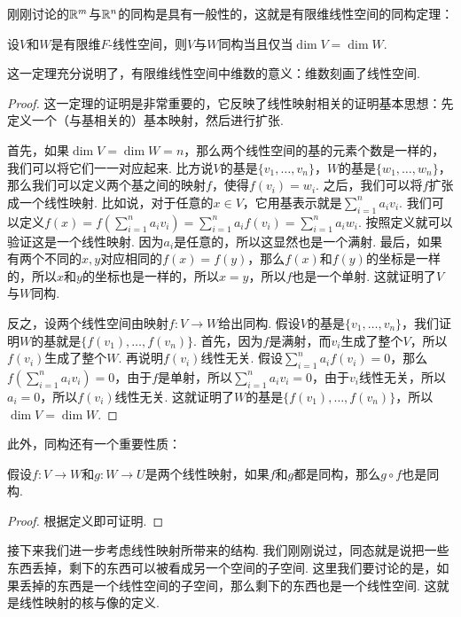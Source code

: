 刚刚讨论的$\mathbb{R}^m$与$\mathbb{R}^n$的同构是具有一般性的，这就是有限维线性空间的同构定理：

\begin{theorem}[有限维线性空间的同构定理]\label{thm:finite-dim-linear-space-isomorphism}
设$V$和$W$是有限维$F$-线性空间，则$V$与$W$同构当且仅当$\dim V=\dim W$. 
\end{theorem}
这一定理充分说明了，有限维线性空间中维数的意义：维数刻画了线性空间. 
\begin{proof}
    这一定理的证明是非常重要的，它反映了线性映射相关的证明基本思想：先定义一个（与基相关的）基本映射，然后进行扩张. 
    
    首先，如果$\dim V=\dim W=n$，那么两个线性空间的基的元素个数是一样的，我们可以将它们一一对应起来. 比方说$V$的基是$\{v_1,\dots,v_n\}$，$W$的基是$\{w_1,\dots,w_n\}$，那么我们可以定义两个基之间的映射$f$，使得$f(v_i)=w_i$. 之后，我们可以将$f$扩张成一个线性映射. 比如说，对于任意的$x\in V$，它用基表示就是$\sum_{i=1}^n a_iv_i$. 我们可以定义$f(x)=f(\sum_{i=1}^n a_iv_i)=\sum_{i=1}^n a_if(v_i)=\sum_{i=1}^n a_iw_i$. 按照定义就可以验证这是一个线性映射. 因为$a_i$是任意的，所以这显然也是一个满射. 最后，如果有两个不同的$x,y$对应相同的$f(x)=f(y)$，那么$f(x)$和$f(y)$的坐标是一样的，所以$x$和$y$的坐标也是一样的，所以$x=y$，所以$f$也是一个单射. 这就证明了$V$与$W$同构. 

    反之，设两个线性空间由映射$f:V\to W$给出同构. 假设$V$的基是$\{v_1,\dots,v_n\}$，我们证明$W$的基就是$\{f(v_1),\dots,f(v_n)\}$. 首先，因为$f$是满射，而$v_i$生成了整个$V$，所以$f(v_i)$生成了整个$W$. 再说明$f(v_i)$线性无关. 假设$\sum_{i=1}^n a_if(v_i)=0$，那么$f(\sum_{i=1}^n a_iv_i)=0$，由于$f$是单射，所以$\sum_{i=1}^n a_iv_i=0$，由于$v_i$线性无关，所以$a_i=0$，所以$f(v_i)$线性无关. 这就证明了$W$的基是$\{f(v_1),\dots,f(v_n)\}$，所以$\dim V=\dim W$. 
\end{proof}

此外，同构还有一个重要性质：
\begin{proposition}\label{prop:isomorphism-composition}
假设$f:V\to W$和$g:W\to U$是两个线性映射，如果$f$和$g$都是同构，那么$g\circ f$也是同构. 
\end{proposition}
\begin{proof}
    根据定义即可证明.     
\end{proof}



接下来我们进一步考虑线性映射所带来的结构. 我们刚刚说过，同态就是说把一些东西丢掉，剩下的东西可以被看成另一个空间的子空间. 这里我们要讨论的是，如果丢掉的东西是一个线性空间的子空间，那么剩下的东西也是一个线性空间. 这就是线性映射的核与像的定义. 

